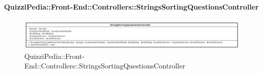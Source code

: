 \paragraph[QuizziPedia::Front-End::Controllers\\::StringsSortingQuestionsController]{QuizziPedia::Front-End::Controllers::StringsSortingQuestionsController}
\begin{figure} [ht]
	\centering
	\includegraphics[scale=0.3]{UML/Classi/Front-End/QuizziPedia_Front-end_Controller_StringSortingQuestionsController.png}
	\caption{QuizziPedia::Front-End::Controllers::StringsSortingQuestionsController}
\end{figure} \FloatBarrier
